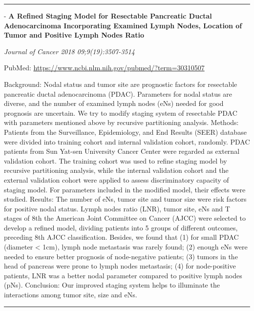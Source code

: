 \documentclass[]{article}
\begin{document}
{}

{}

\begin{center}\rule{0.5\linewidth}{\linethickness}\end{center}

 - \textbf{A Refined Staging Model for Resectable Pancreatic Ductal
Adenocarcinoma Incorporating Examined Lymph Nodes, Location of Tumor and
Positive Lymph Nodes Ratio}

\emph{Journal of Cancer 2018 09;9(19):3507-3514}

PubMed: \url{https://www.ncbi.nlm.nih.gov/pubmed/?term=30310507}

Background: Nodal status and tumor site are prognostic factors for
resectable pancreatic ductal adenocarcinoma (PDAC). Parameters for nodal
status are diverse, and the number of examined lymph nodes (eNs) needed
for good prognosis are uncertain. We try to modify staging system of
resectable PDAC with parameters mentioned above by recursive
partitioning analysis. Methods: Patients from the Surveillance,
Epidemiology, and End Results (SEER) database were divided into training
cohort and internal validation cohort, randomly. PDAC patients from Sun
Yat-sen University Cancer Center were regarded as external validation
cohort. The training cohort was used to refine staging model by
recursive partitioning analysis, while the internal validation cohort
and the external validation cohort were applied to assess discriminatory
capacity of staging model. For parameters included in the modified
model, their effects were studied. Results: The number of eNs, tumor
site and tumor size were risk factors for positive nodal status. Lymph
nodes ratio (LNR), tumor site, eNs and T stages of 8th the American
Joint Committee on Cancer (AJCC) were selected to develop a refined
model, dividing patients into 5 groups of different outcomes, preceding
8th AJCC classification. Besides, we found that (1) for small PDAC
(diameter \textless{} 1cm), lymph node metastasis was rarely found; (2)
enough eNs were needed to ensure better prognosis of node-negative
patients; (3) tumors in the head of pancreas were prone to lymph nodes
metastasis; (4) for node-positive patients, LNR was a better nodal
parameter compared to positive lymph nodes (pNs). Conclusion: Our
improved staging system helps to illuminate the interactions among tumor
site, size and eNs.

{}

{}

\begin{center}\rule{0.5\linewidth}{\linethickness}\end{center}
\end{document}
